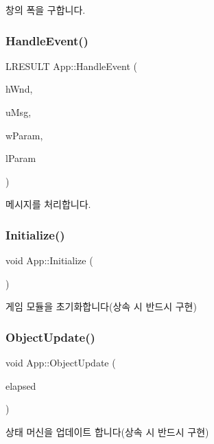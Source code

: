 창의 폭을 구합니다. \mbox{\label{class_app_a194f25e8c5de264e292f548c3682a818}} 
\subsubsection{\texorpdfstring{HandleEvent()}{HandleEvent()}}
{\footnotesize\ttfamily L\+R\+E\+S\+U\+LT App\+::\+Handle\+Event (\begin{DoxyParamCaption}\item[{H\+W\+ND}]{h\+Wnd,  }\item[{U\+I\+NT}]{u\+Msg,  }\item[{W\+P\+A\+R\+AM}]{w\+Param,  }\item[{L\+P\+A\+R\+AM}]{l\+Param }\end{DoxyParamCaption})}

메시지를 처리합니다. \mbox{\label{class_app_ab6135ee4083dbe23d9f61fe7cd63291e}} 
\subsubsection{\texorpdfstring{Initialize()}{Initialize()}}
{\footnotesize\ttfamily void App\+::\+Initialize (\begin{DoxyParamCaption}{ }\end{DoxyParamCaption})\hspace{0.3cm}{\ttfamily [virtual]}}

게임 모듈을 초기화합니다(상속 시 반드시 구현) \mbox{\label{class_app_a83fc920c6295c48847eb408eaa4afaf1}} 
\subsubsection{\texorpdfstring{ObjectUpdate()}{ObjectUpdate()}}
{\footnotesize\ttfamily void App\+::\+Object\+Update (\begin{DoxyParamCaption}\item[{double}]{elapsed }\end{DoxyParamCaption})\hspace{0.3cm}{\ttfamily [virtual]}}

상태 머신을 업데이트 합니다(상속 시 반드시 구현)


